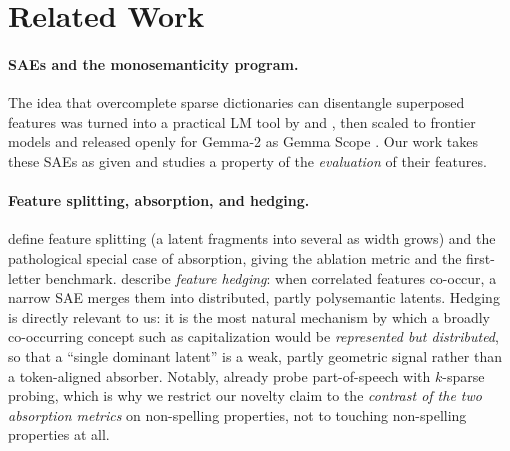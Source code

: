 \documentclass[11pt]{article}
\theoremstyle{definition}
\begin{document}
\section{Related Work}\label{sec:related}
\paragraph{SAEs and the monosemanticity program.}
The idea that overcomplete sparse dictionaries can disentangle superposed features
\citep{elhage2022superposition} was turned into a practical LM tool by \citet{bricken2023monosemanticity}
and \citet{cunningham2023sparse}, then scaled to frontier models \citep{templeton2024scaling} and released
openly for Gemma-2 as Gemma Scope \citep{lieberum2024gemmascope}. Our work takes these SAEs as given and
studies a property of the \emph{evaluation} of their features.

\paragraph{Feature splitting, absorption, and hedging.}
\citet{chanin2024absorption} define feature splitting (a latent fragments into several as width grows) and
the pathological special case of absorption, giving the ablation metric and the first-letter benchmark.
\citet{chanin2025hedging} describe \emph{feature hedging}: when correlated features co-occur, a narrow SAE
merges them into distributed, partly polysemantic latents. Hedging is directly relevant to us: it is the
most natural mechanism by which a broadly co-occurring concept such as capitalization would be
\emph{represented but distributed}, so that a ``single dominant latent'' is a weak, partly geometric signal
rather than a token-aligned absorber. Notably, \citet{chanin2025hedging} already probe part-of-speech with
$k$-sparse probing, which is why we restrict our novelty claim to the \emph{contrast of the two absorption
metrics} on non-spelling properties, not to touching non-spelling properties at all.
\end{document}
